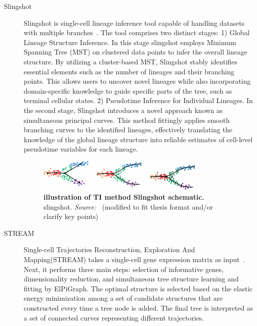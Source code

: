 \begin{description}
    \item[Slingshot]
    Slingshot is single-cell lineage inference tool capable of handling datasets with multiple branches~\citep{street2018slingshot}. The tool comprises two distinct stages: 1) Global Lineage Structure Inference. In this stage slingshot employs Minimum Spanning Tree (MST) on clustered data points to infer the overall lineage structure. By utilizing a cluster-based MST, Slingshot stably identifies essential elements such as the number of lineages and their branching points. This allows users to uncover novel lineages while also incorporating domain-specific knowledge to guide specific parts of the tree, such as terminal cellular states. 2) Pseudotime Inference for Individual Lineages. In the second stage, Slingshot introduces a novel approach known as simultaneous principal curves. This method fittingly applies smooth branching curves to the identified lineages, effectively translating the knowledge of the global lineage structure into reliable estimates of cell-level pseudotime variables for each lineage.
    \begin{figure}[ht!]
    	\centering
    	\includegraphics[width=0.8\textwidth]{TI_Alg_slingshot/fig}
    	\vspace{0.1cm}
    	\caption[Illustration of TI method Slingshot schematic.]{\textbf{illustration of TI method Slingshot schematic.}
    	slingshot. \emph{Source:~\cite{street2018slingshot}} (modified to fit thesis format and/or clarify key points)
    	}
    	\label{fig:TI_Alg_slingshot}
    \end{figure}

    \item[STREAM]
    Single-cell Trajectories Reconstruction, Exploration And Mapping(STREAM) takes a single-cell gene expression matrix as input~\citep{chen2019stream}. Next, it performs three main steps: selection of informative genes, dimensionality reduction, and simultaneous tree structure learning and fitting by ElPiGraph. The optimal structure is selected based on the elastic energy minimization among a set of candidate structures that are constructed every time a tree node is added. The final tree is interpreted as a set of connected curves representing different trajectories.


\end{description}
